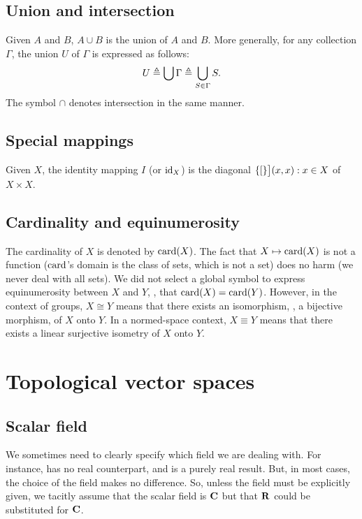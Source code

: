 \subsection{Union and intersection}%
Given $A$ and $B$, $A\cup B$ is the union of $A$ and $B$. More generally, for any collection $\Gamma$, the union $U$ of %
$\Gamma$ is expressed as follows:
% 
\begin{equation}
U \triangleq \bigcup \Gamma \triangleq \bigcup_{S \in \Gamma} S.
\end{equation}
% 
The symbol $\cap$ denotes intersection in the same manner. %
% 
\subsection{Special mappings}
Given $X$, the identity mapping $I$ (or $\mathrm{id}_{X}$) is the diagonal $\{[\}\big]{(x,x): x\in X}$ of $X \times X$. %
% 
\subsection{Cardinality and equinumerosity}%
The cardinality of $X$ is denoted by $\operatorname{card}(X)$. The fact that $X \mapsto \operatorname{card}(X)$ is not a function ($\operatorname{card}$'s domain %
is the class of sets, which is not a set) does no harm (we never deal with all sets). We did not select a global symbol %
to express equinumerosity between $X$ and $Y$, \ie, that $\operatorname{card}(X)= \operatorname{card}(Y)$. However, in the context of groups, %
$X\cong Y$ means that there exists an isomorphism, \ie, a bijective morphism, of $X$ onto $Y$. In a normed-space context, %
$X\equiv Y$ means that there exists a linear surjective isometry of $X$ onto $Y$. %
% 
\section{Topological vector spaces}
\subsection{Scalar field}%
We sometimes need to clearly specify which field we are dealing with. For instance,  has no real counterpart, and 
 is a purely real result. But, in most cases, the choice of the field makes no difference. So, unless the field %
must be explicitly given, we tacitly assume that the scalar field is $\mathbf{C}$ but that $\mathbf{R}$ could be substituted for %
$\mathbf{C}$. 
% 
